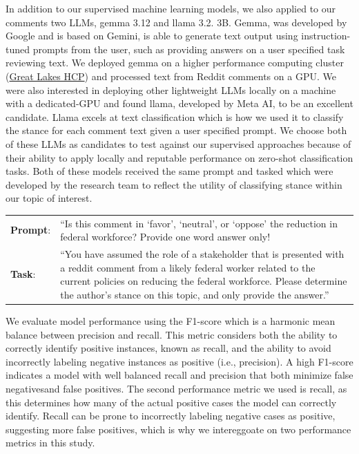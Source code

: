 \documentclass[
  12pt]{article}
\begin{document}
In addition to our supervised machine learning models, we also applied
to our comments two LLMs, gemma 3.12 and llama 3.2. 3B. Gemma, was
developed by Google and is based on Gemini, is able to generate text
output using instruction-tuned prompts from the user, such as providing
answers on a user specified task reviewing text. We deployed gemma on a
higher performance computing cluster
(\href{https://its.umich.edu/advanced-research-computing/}{Great Lakes
HCP}) and processed text from Reddit comments on a GPU. We were also
interested in deploying other lightweight LLMs locally on a machine with
a dedicated-GPU and found llama, developed by Meta AI, to be an
excellent candidate. Llama excels at text classification which is how we
used it to classify the stance for each comment text given a user
specified prompt. We choose both of these LLMs as candidates to test
against our supervised approaches because of their ability to apply
locally and reputable performance on zero-shot classification tasks.
Both of these models received the same prompt and tasked which were
developed by the research team to reflect the utility of classifying
stance within our topic of interest.

\begin{longtable}[]{@{}
  >{\raggedright\arraybackslash}p{}
  >{\raggedright\arraybackslash}p{}@{}}
\toprule\noalign{}
\endhead
\bottomrule\noalign{}
\endlastfoot
\textbf{Prompt}: & ``Is this comment in `favor', `neutral', or `oppose'
the reduction in federal workforce? Provide one word answer only! \\
\textbf{Task}: & ``You have assumed the role of a stakeholder that is
presented with a reddit comment from a likely federal worker related to
the current policies on reducing the federal workforce. Please determine
the author's stance on this topic, and only provide the answer.'' \\
\end{longtable}

We evaluate model performance using the F1-score which is a harmonic
mean balance between precision and recall. This metric considers both
the ability to correctly identify positive instances, known as recall,
and the ability to avoid incorrectly labeling negative instances as
positive (i.e., precision). A high F1-score indicates a model with well
balanced recall and precision that both minimize false negativesand
false positives. The second performance metric we used is recall, as
this determines how many of the actual positive cases the model can
correctly identify. Recall can be prone to incorrectly labeling negative
cases as positive, suggesting more false positives, which is why we
intereggoate on two performance metrics in this study.
\end{document}
